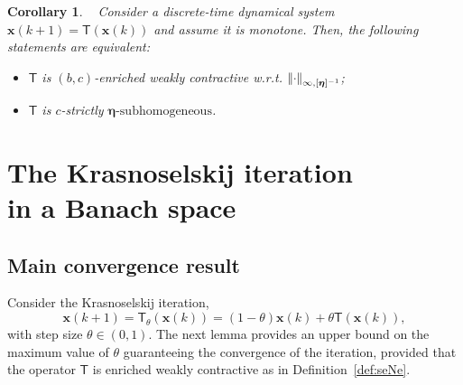 \documentclass[journal,twoside,web]{ieeecolor}
\newcommand{\norm}[1]{{\left\vert\kern-0.25ex\left\vert #1\right\vert\kern-0.25ex\right\vert}}
\newcommand{\xb}{\boldsymbol{x}}
\newcommand{\etab}{\boldsymbol{\eta}}
\newcommand{\Ts}{\mathsf{T}}
\newtheorem{cor}{Corollary}
\begin{document}
\begin{cor}\label{cor:monoKSPC}
~
Consider a discrete-time dynamical system ${\xb(k+1)=\Ts(\xb(k))}$ and assume it is monotone.
%
%
Then, the following statements are equivalent:
%
\begin{itemize}
    \item[(i)] $\Ts$ is $(b,c)$-enriched weakly contractive w.r.t. $\norm{\cdot}_{\infty,[\etab]^{-1}}$;
    \item[(ii)] $\Ts$ is $c$-strictly $\etab\text{-subhomogeneous}$.
\end{itemize}
\end{cor}

\section{The Krasnoselskij iteration\\ in a Banach space}\label{sec:krasno}

\subsection{Main convergence result}

Consider the Krasnoselskij iteration,
%
\begin{equation}\label{eq:mainiter}
    \xb(k+1) =\Ts_\theta(\xb(k)) = (1-\theta)\xb(k)+\theta \Ts(\xb(k)),
\end{equation}
%
with step size $\theta \in(0,1)$. The next lemma provides an upper bound on the maximum value of $\theta$ guaranteeing the convergence of the iteration, provided that the operator $\Ts$ is enriched weakly contractive as in Definition~\ref{def:seNe}.
%
\end{document}
